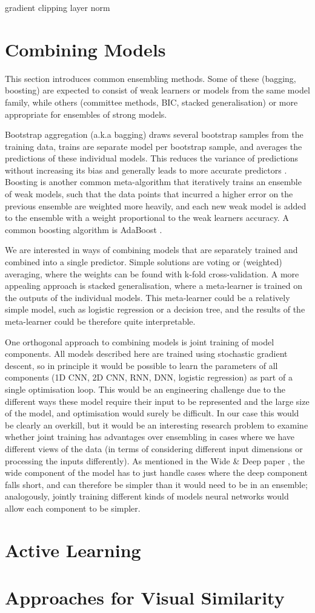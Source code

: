 gradient clipping
layer norm

\section{Combining Models}
\label{bg_ensembling}

This section  introduces common ensembling methods.
Some of these (bagging, boosting)  are expected to consist of weak learners or models from the same model family, while others (committee methods, BIC, stacked generalisation) or more appropriate for ensembles of strong models.

Bootstrap aggregation (a.k.a bagging)   draws several bootstrap samples  from the training data,  trains are separate model per bootstrap sample,  and averages the predictions of these individual models.  This reduces the variance of predictions without increasing its bias and generally leads to  more accurate predictors \cite{bagging}.
Boosting is another common meta-algorithm that iteratively trains an ensemble of weak models, such that the data points that incurred a higher error on the previous ensemble are weighted more heavily, and each new weak model is added to the ensemble with a weight proportional to the weak learners accuracy.
A common boosting algorithm is AdaBoost \cite{adaboost}.

We are interested in ways of combining models that are separately trained and combined into a single predictor.
Simple solutions are voting or (weighted) averaging, where the weights can be found with k-fold cross-validation.
A more appealing approach is stacked generalisation, where a meta-learner is trained on the outputs of the individual models.
This meta-learner could be a relatively simple model, such as logistic regression or a decision tree, and the results of the meta-learner could be therefore quite interpretable.

One orthogonal approach to combining models is joint training of model components.
All models described here are trained using stochastic gradient descent, so in principle it would be possible to learn the parameters of all components (1D CNN, 2D CNN, RNN, DNN, logistic regression) as part of a single optimisation loop.
This would be an engineering challenge due to the different ways these model require their input to be represented and the large size of the model, and optimisation would surely be difficult.
In our case this would be clearly an overkill, but it would be an interesting research problem to examine whether joint training has advantages over ensembling in cases where we have different views of the data (in terms of considering different input dimensions or processing the inputs differently).
As mentioned in the Wide \& Deep paper \cite{wide_deep}, the wide component of the model has to just handle cases where the deep component falls short, and can therefore be simpler than it would need to be in an ensemble; analogously, jointly training different kinds of models neural networks would allow each component to be simpler.

\section{Active Learning}
\label{bg_al}


\section{Approaches for Visual Similarity}
\label{bg_sim}
